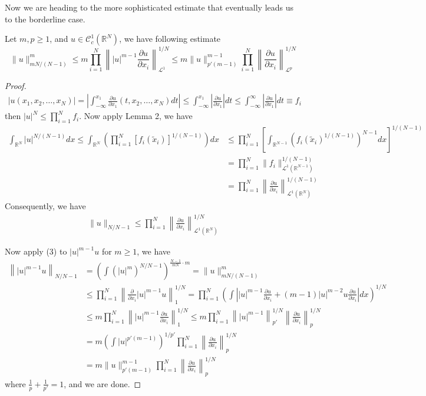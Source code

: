 \documentclass{article}
\begin{document}
Now we are heading to the more sophisticated estimate that eventually leads us to the borderline case.

\begin{Lem}
    Let $m, p\geq 1$, and $u\in\mathscr{C}^{1}_{c}(\mathbb{R}^N)$, we have following estimate
    $$
    \|u\|_{mN/(N-1)}^{m}\leq m\prod_{i=1}^{N}\left\||u|^{m-1}\frac{\partial u}{\partial x_i}\right\|_{\mathscr{L}^1}^{1/N}\leq m\|u\|_{p'(m-1)}^{m-1}\prod_{i=1}^{N}\left\|\frac{\partial u}{\partial x_i}\right\|_{\mathscr{L}^p}^{1/N}
    $$
\end{Lem}

\begin{proof}
    \begin{align*}
    |u(x_1, x_2, \dots, x_N)|=\left|\int_{-\infty}^{x_1}\frac{\partial u}{\partial x_1}(t, x_2, \dots, x_N)dt\right|\leq\int^{x_1}_{-\infty}\left|\frac{\partial u}{\partial x_1}\right|dt\leq\int_{-\infty}^{\infty}\left|\frac{\partial u}{\partial x_1}\right|dt\equiv f_i
    \end{align*}
    then $|u|^N\leq\prod_{i=1}^{N}f_i$. Now apply Lemma 2, we have
    \begin{align*}
        \int_{\mathbb{R}^N}|u|^{N/(N-1)}dx\leq \int_{\mathbb{R}^N}\left(\prod_{i=1}^{N}[f_{i}(\tilde{x}_{i})]^{1/(N-1)}\right)dx&\leq\prod_{i=1}^{N}\left[\int_{\mathbb{R}^{N-1}}\left(f_{i}(\tilde{x}_{i})^{1/(N-1)}\right)^{N-1}dx\right]^{1/(N-1)}\\
        &=\prod_{i=1}^{N}\|f_{i}\|_{\mathscr{L}^1(\mathbb{R}^{N-1})}^{1/(N-1)} \\
        &=\prod_{i=1}^{N}\left\|\frac{\partial u}{\partial x_i}\right\|_{\mathscr{L}^{1}(\mathbb{R}^N)}^{1/(N-1)}
    \end{align*}
    Consequently, we have 
    \begin{align}
        \|u\|_{N/N-1}\leq\prod_{i=1}^{N}\left\|\frac{\partial u}{\partial x_i}\right\|_{\mathscr{L}^{1}(\mathbb{R}^N)}^{1/N}
    \end{align}
    
    Now apply (3) to $|u|^{m-1}u$ for $m\geq 1$, we have 
    \begin{align*}
        \left\||u|^{m-1}u\right\|_{N/N-1}&=\left(\int(|u|^{m})^{N/N-1}\right)^{\frac{N-1}{mN}\cdot m}=\|u\|_{mN/(N-1)}^{m} \\
        &\leq \prod_{i=1}^{N}\left\|\frac{\partial}{\partial x_i}|u|^{m-1}u\right\|_1^{1/N}=\prod_{i=1}^{N}\left(\int\left||u|^{m-1}\frac{\partial u}{\partial x_i}+(m-1)|u|^{m-2}u\frac{\partial u}{\partial x_i}\right|dx\right)^{1/N} \\
        &\leq m\prod_{i=1}^{N}\left\||u|^{m-1}\frac{\partial u}{\partial x_i}\right\|_1^{1/N}\leq m\prod_{i=1}^{N}\left\||u|^{m-1}\right\|_{p'}^{1/N}\left\|\frac{\partial u}{\partial x_i}\right\|_p^{1/N} \\
        &=m\left(\int|u|^{p'(m-1)}\right)^{1/p'}\prod_{i=1}^{N}\left\|\frac{\partial u}{\partial x_i}\right\|_p^{1/N} \\
        &=m\|u\|_{p'(m-1)}^{m-1}\prod_{i=1}^{N}\left\|\frac{\partial u}{\partial x_i}\right\|_p^{1/N}
    \end{align*}
    where $\frac{1}{p}+\frac{1}{p'}=1$, and we are done.
\end{proof}
\end{document}
